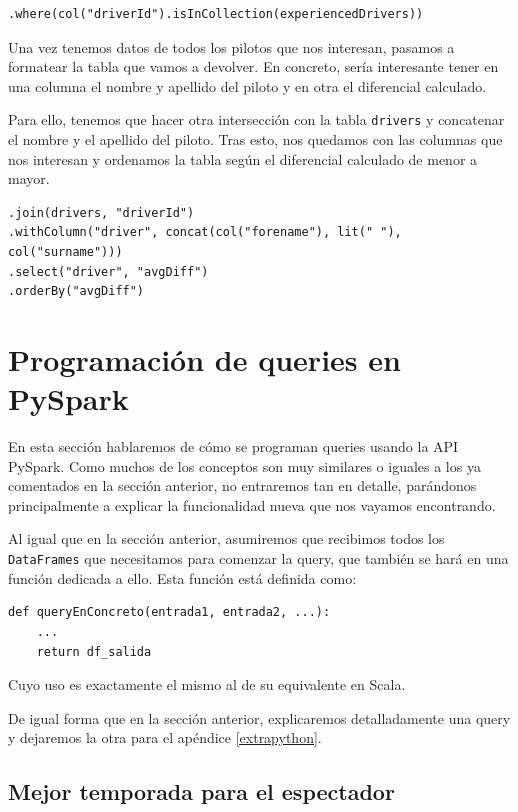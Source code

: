 \documentclass[12pt,twoside,titlepage]{report}
\begin{document}
\begin{lstlisting}
.where(col("driverId").isInCollection(experiencedDrivers))
\end{lstlisting}

Una vez tenemos datos de todos los pilotos que nos interesan, pasamos a formatear la tabla que vamos a devolver. En concreto, sería interesante tener en una columna el nombre y apellido del piloto y en otra el diferencial calculado.

Para ello, tenemos que hacer otra intersección con la tabla \texttt{drivers} y concatenar el nombre y el apellido del piloto. Tras esto, nos quedamos con las columnas que nos interesan y ordenamos la tabla según el diferencial calculado de menor a mayor.

\begin{lstlisting}
.join(drivers, "driverId")
.withColumn("driver", concat(col("forename"), lit(" "), col("surname")))
.select("driver", "avgDiff")
.orderBy("avgDiff")
\end{lstlisting}


\section{Programación de queries en PySpark}

En esta sección hablaremos de cómo se programan queries usando la API PySpark. Como muchos de los conceptos son muy similares o iguales a los ya comentados en la sección anterior, no entraremos tan en detalle, parándonos principalmente a explicar la funcionalidad nueva que nos vayamos encontrando.

Al igual que en la sección anterior, asumiremos que recibimos todos los \texttt{DataFrames} que necesitamos para comenzar la query, que también se hará en una función dedicada a ello. Esta función está definida como:

\begin{lstlisting}
def queryEnConcreto(entrada1, entrada2, ...):
	...
	return df_salida
\end{lstlisting}

Cuyo uso es exactamente el mismo al de su equivalente en Scala.

De igual forma que en la sección anterior, explicaremos detalladamente una query y dejaremos la otra para el apéndice \ref{extrapython}.

\subsection{Mejor temporada para el espectador}
\end{document}
